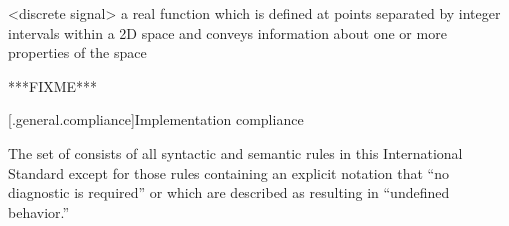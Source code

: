 <discrete signal> a real function which is defined at points separated by 
integer intervals within a 2D space and conveys information about one or more 
properties of the space

***FIXME***


[\iotwod.general.compliance]{Implementation compliance}

\pnum
{}%
%
The set of
consists of all syntactic and semantic rules in this International
Standard except for those rules containing an explicit notation that
``no diagnostic is required'' or which are described as resulting in
``undefined behavior.''
